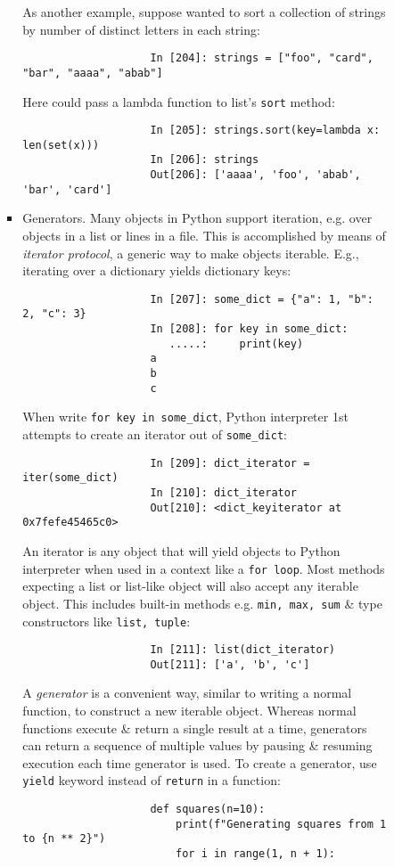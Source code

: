 \documentclass{article}
\begin{document}
\begin{enumerate}
\begin{itemize}
\begin{itemize}
\begin{itemize}
				As another example, suppose wanted to sort a collection of strings by number of distinct letters in each string:
				\begin{verbatim}
					In [204]: strings = ["foo", "card", "bar", "aaaa", "abab"]
				\end{verbatim}
				Here could pass a lambda function to list's {\tt sort} method:
				\begin{verbatim}
					In [205]: strings.sort(key=lambda x: len(set(x)))
					In [206]: strings
					Out[206]: ['aaaa', 'foo', 'abab', 'bar', 'card']
				\end{verbatim}
				\item {\sf Generators.} Many objects in Python support iteration, e.g. over objects in a list or lines in a file. This is accomplished by means of {\it iterator protocol}, a generic way to make objects iterable. E.g., iterating over a dictionary yields dictionary keys:
				\begin{verbatim}
					In [207]: some_dict = {"a": 1, "b": 2, "c": 3}
					In [208]: for key in some_dict:
					   .....:     print(key)
					a
					b
					c
				\end{verbatim}
				When write \verb|for key in some_dict|, Python interpreter 1st attempts to create an iterator out of \verb|some_dict|:
				\begin{verbatim}
					In [209]: dict_iterator = iter(some_dict)
					In [210]: dict_iterator
					Out[210]: <dict_keyiterator at 0x7fefe45465c0>
				\end{verbatim}
				An iterator is any object that will yield objects to Python interpreter when used in a context like a {\tt for loop}. Most methods expecting a list or list-like object will also accept any iterable object. This includes built-in methods e.g. {\tt min, max, sum} \& type constructors like {\tt list, tuple}:
				\begin{verbatim}
					In [211]: list(dict_iterator)
					Out[211]: ['a', 'b', 'c']
				\end{verbatim}
				A {\it generator} is a convenient way, similar to writing a normal function, to construct a new iterable object. Whereas normal functions execute \& return a single result at a time, generators can return a sequence of multiple values by pausing \& resuming execution each time generator is used. To create a generator, use {\tt yield} keyword instead of {\tt return} in a function:
				\begin{verbatim}
					def squares(n=10):
					    print(f"Generating squares from 1 to {n ** 2}")
					    for i in range(1, n + 1):

\end{verbatim}
\end{itemize}
\end{itemize}
\end{itemize}
\end{enumerate}
\end{document}
